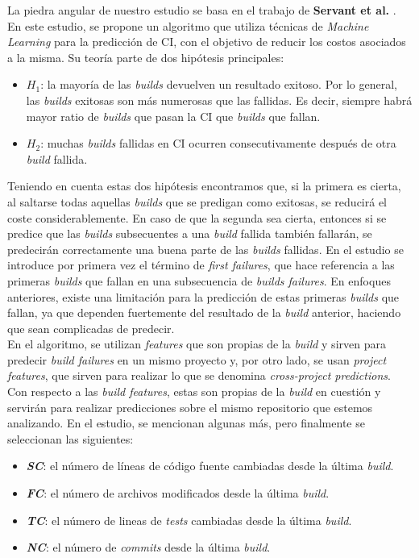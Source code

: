 La piedra angular de nuestro estudio se basa en el trabajo de \textbf{Servant et al.} \cite{2}. En
este estudio, se propone un algoritmo que utiliza técnicas de \textit{Machine Learning}
para la predicción de CI, con el objetivo de reducir los costos asociados a la misma.
Su teoría parte de dos hipótesis principales:

\begin{itemize}
      \item \textit{$H_1$}: la mayoría de las \textit{builds} devuelven un resultado exitoso. Por
      lo general, las \textit{builds} exitosas son más numerosas que las fallidas. Es decir,
      siempre habrá mayor ratio de \textit{builds} que pasan la CI que \textit{builds}
      que fallan.
      \item \textit{$H_2$}: muchas \textit{builds} fallidas en CI ocurren
      consecutivamente después de otra \textit{build} fallida.
\end{itemize}

Teniendo en cuenta estas dos hipótesis encontramos que, si la primera es cierta, al saltarse todas
aquellas \textit{builds} que se predigan como exitosas, se reducirá el coste considerablemente.
En caso de que la segunda sea cierta, entonces si se predice que las \textit{builds} subsecuentes a una
\textit{build} fallida también fallarán, se predecirán correctamente una buena parte de las
\textit{builds} fallidas. En el estudio se introduce por primera vez el término de \textit{first
failures}, que hace referencia a las primeras \textit{builds} que fallan en una subsecuencia de
\textit{builds failures}. En enfoques anteriores, existe una limitación para la predicción
de estas primeras \textit{builds} que fallan, ya que dependen fuertemente del resultado de la
\textit{build} anterior, haciendo que sean complicadas de predecir.\\

En el algoritmo, se utilizan \textit{features} que son propias de la \textit{build} y
sirven para predecir \textit{build failures} en un mismo proyecto y, por otro lado, se usan
\textit{project features}, que sirven para realizar lo que se denomina \textit{cross-project
predictions}. Con respecto a las \textit{build features}, estas son propias de la \textit{build}
en cuestión y servirán para realizar predicciones sobre el mismo repositorio que estemos
analizando. En el estudio, se mencionan algunas más, pero finalmente se seleccionan las
siguientes:

\begin{itemize}
      \item \textbf{\textit{SC}}: el número de líneas de código fuente cambiadas desde la
      última \textit{build}.
      \item \textbf{\textit{FC}}: el número de archivos modificados desde la última
      \textit{build}.
      \item \textbf{\textit{TC}}: el número de lineas de \textit{tests} cambiadas desde la
      última \textit{build}.
      \item \textbf{\textit{NC}}: el número de \textit{commits} desde la última \textit{build}.
\end{itemize}

